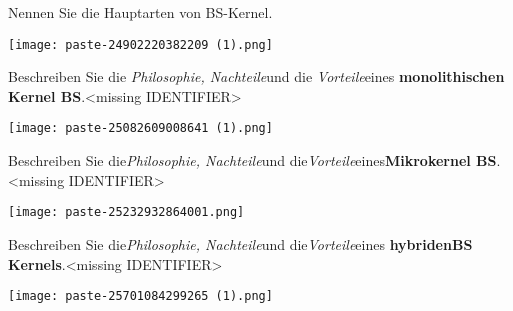 \documentclass{article}
\begin{document}
\begin{tcolorbox}[colback=white!10!white,colframe=lightgray!75!black,
  savelowerto=\jobname_ex.tex,breakable,enhanced,lines before break=40]

\justifying
Nennen Sie die Hauptarten von BS-Kernel.

\tcblower

\justifying
\begin{center}
\texttt{[image: paste-24902220382209 (1).png]}
\end{center}

\end{tcolorbox}
\begin{tcolorbox}[colback=white!10!white,colframe=lightgray!75!black,
  savelowerto=\jobname_ex.tex,breakable,enhanced,lines before break=40]

\justifying
Beschreiben Sie die \textit{Philosophie, Nachteile}und die \textit{Vorteile}eines \textbf{monolithischen Kernel BS}.<missing IDENTIFIER>

\tcblower

\justifying
\begin{center}
\texttt{[image: paste-25082609008641 (1).png]}
\end{center}

\end{tcolorbox}
\begin{tcolorbox}[colback=white!10!white,colframe=lightgray!75!black,
  savelowerto=\jobname_ex.tex,breakable,enhanced,lines before break=40]

\justifying
Beschreiben Sie die\textit{Philosophie, Nachteile}und die\textit{Vorteile}eines\textbf{Mikrokernel BS}.<missing IDENTIFIER>

\tcblower

\justifying
\begin{center}
\texttt{[image: paste-25232932864001.png]}
\end{center}

\end{tcolorbox}
\begin{tcolorbox}[colback=white!10!white,colframe=lightgray!75!black,
  savelowerto=\jobname_ex.tex,breakable,enhanced,lines before break=40]

\justifying
Beschreiben Sie die\textit{Philosophie, Nachteile}und die\textit{Vorteile}eines \textbf{hybridenBS Kernels}.<missing IDENTIFIER>

\tcblower

\justifying
\begin{center}
\texttt{[image: paste-25701084299265 (1).png]}
\end{center}

\end{tcolorbox}
\end{document}
